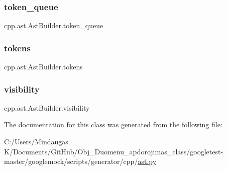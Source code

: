 \mbox{\label{classcpp_1_1ast_1_1_ast_builder_ae167f12797e7c02c1b60c11c83cdb22f}} 
\subsubsection{\texorpdfstring{token\_queue}{token\_queue}}
{\footnotesize\ttfamily cpp.\+ast.\+Ast\+Builder.\+token\+\_\+queue}

\mbox{\label{classcpp_1_1ast_1_1_ast_builder_a1b21f8bef712e91862ccb6b1147cab0d}} 
\subsubsection{\texorpdfstring{tokens}{tokens}}
{\footnotesize\ttfamily cpp.\+ast.\+Ast\+Builder.\+tokens}

\mbox{\label{classcpp_1_1ast_1_1_ast_builder_a2f16b19846c405101235432d2666b614}} 
\subsubsection{\texorpdfstring{visibility}{visibility}}
{\footnotesize\ttfamily cpp.\+ast.\+Ast\+Builder.\+visibility}



The documentation for this class was generated from the following file\+:\begin{DoxyCompactItemize}
\item 
C\+:/\+Users/\+Mindaugas K/\+Documents/\+Git\+Hub/\+Obj\+\_\+\+Duomenu\+\_\+apdorojimas\+\_\+class/googletest-\/master/googlemock/scripts/generator/cpp/\mbox{\hyperlink{googletest-master_2googlemock_2scripts_2generator_2cpp_2ast_8py}{ast.\+py}}\end{DoxyCompactItemize}
